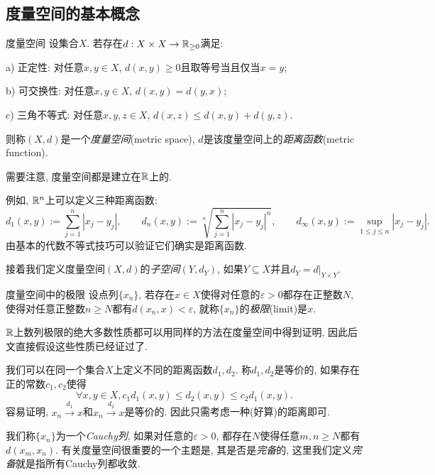 \subsection{度量空间的基本概念}

\begin{axiom}{度量空间}
	设集合$X$. 若存在$d:X \times X \to \mathbb{R} _{\geq 0}$满足: 
	
	a) 正定性: 对任意$x,y \in X$, $d(x,y)\geq 0$且取等号当且仅当$x=y$; 
	
	b) 可交换性: 对任意$x,y \in X$, $d(x,y)=d(y,x)$; 
	
	c) 三角不等式: 对任意$x,y,z \in X$, $d(x,z) \leq d(x,y)+d(y,z)$. 
	
	\noindent
	则称$(X,d)$是一个\textit{度量空间}(metric space), $d$是该度量空间上的\textit{距离函数}(metric function). 
\end{axiom}
\begin{remark}
	需要注意, 度量空间都是建立在$\mathbb{R}$上的. 
\end{remark}

例如, $\mathbb{R} ^n$上可以定义三种距离函数: $$d_1(x,y) := \sum_{j=1}^n |x_j-y_j|,\qquad d_n(x,y) := \sqrt[n]{\sum_{j=1}^n |x_j-y_j|^n},\qquad d_{\infty}(x,y) := \sup_{1 \leq j \leq n}|x_j-y_j|. $$
由基本的代数不等式技巧可以验证它们确实是距离函数. 

接着我们定义度量空间$(X,d)$的\textit{子空间}$(Y,d_Y)$, 如果$Y \subseteq X$并且$d_Y = d|_{Y \times Y}$. 

\begin{definition}{度量空间中的极限}
	设点列$\{ x_n \}$, 若存在$x \in X$使得对任意的$\varepsilon >0$都存在正整数$N$, 使得对任意正整数$n\geq N$都有$d(x_n,x)<\varepsilon$, 就称$\{ x_n \}$的\textit{极限}(limit)是$x$. 
\end{definition}
\begin{remark}
	$\mathbb{R}$上数列极限的绝大多数性质都可以用同样的方法在度量空间中得到证明, 因此后文直接假设这些性质已经证过了. 
\end{remark}

我们可以在同一个集合$X$上定义不同的距离函数$d_1,d_2$. 称$d_1,d_2$是等价的, 如果存在正的常数$c_1,c_2$使得$$\forall x,y \in X, c_1d_1(x,y) \leq d_2(x,y) \leq c_2d_1(x,y).$$
容易证明, $x_n \stackrel{d_1}{\longrightarrow} x$和$x_n \stackrel{d_2}{\longrightarrow} x$是等价的. 因此只需考虑一种(好算)的距离即可. 

我们称$\{ x_n \}$为一个\textit{Cauchy列}, 如果对任意的$\varepsilon >0$, 都存在$N$使得任意$m,n \geq N$都有$d(x_m,x_n)$. 有关度量空间很重要的一个主题是, 其是否是\textit{完备}的, 这里我们定义\textit{完备}就是指所有Cauchy列都收敛. 

